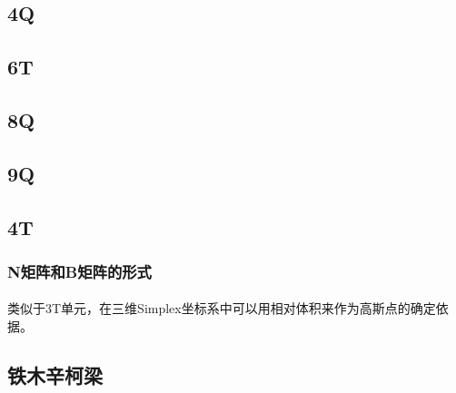 \documentclass[UTF8]{ctexbook}
\begin{document}
\subsection{4Q}

\subsection{6T}

\subsection{8Q}

\subsection{9Q}

\subsection{4T}
\subsubsection{N矩阵和B矩阵的形式}
\paragraph{}
类似于3T单元，在三维Simplex坐标系中可以用相对体积来作为高斯点的确定依据。

\subsection{铁木辛柯梁}
\end{document}
